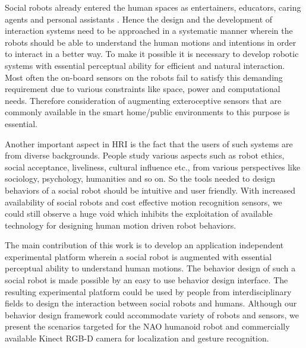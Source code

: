 \documentclass{llncs}
\begin{document}
	Social robots already entered the human spaces as entertainers, educators, caring agents and personal assistants \cite{Aldebaran}. Hence the design and the development of interaction systems need to be approached in a systematic manner wherein the robots should be able to understand the human motions and intentions in order to interact in a better way. To make it possible it is necessary to develop robotic systems with essential perceptual ability for efficient and natural interaction. Most often the on-board sensors on the robots fail to satisfy this demanding requirement due to various constraints like space, power and computational needs. Therefore consideration of augmenting exteroceptive sensors that are commonly available in the smart home/public environments to this purpose is essential.

	Another important aspect in HRI is the fact that the users of such systems are from diverse backgrounds. People study various aspects such as robot ethics, social acceptance, liveliness, cultural influence etc., from various perspectives like sociology, psychology, humanities and so on. So the tools needed to design behaviors of a social robot should be intuitive and user friendly.  With increased availability of social robots and cost effective motion recognition sensors, we could still observe a huge void which inhibits the exploitation of available technology for designing human motion driven robot behaviors.

	The main contribution of this work is to develop an application independent experimental platform wherein a social robot is augmented with essential perceptual ability to understand human motions. The behavior design of such a social robot is made possible by an easy to use behavior design interface. The resulting experimental platform could be used by people from interdisciplinary fields to design the interaction between social robots and humans. Although our behavior design framework could accommodate variety of robots and sensors, we present the scenarios targeted for the NAO \cite{NaoRobot} humanoid robot and commercially available Kinect \cite{Kinect2014} RGB-D camera for localization and gesture recognition. 
\end{document}
